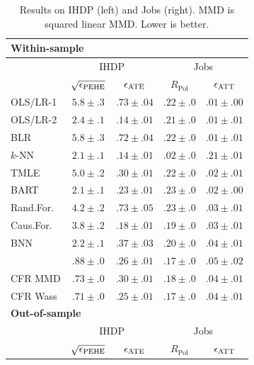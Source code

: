 \begin{table}[t!]
  \caption{\label{tbl:ihdp_jobs_results}Results on IHDP (left) and Jobs (right). MMD is squared linear MMD. Lower is better. \vspace{-1.3em}}
  \begin{center}
    \begin{small}
      \begin{sc}
      \begin{tabular}{l|cc|cc}
        \multicolumn{5}{l}{\bf{Within-sample}} \\
        \hline
        & \multicolumn{2}{c|}{IHDP} & \multicolumn{2}{c}{Jobs} \\
        & $\sqrt{\epsilon_{\text{PEHE}}}$ & $\epsilon_{\text{ATE}}$ & $R_{\text{Pol}}$  & $\epsilon_{\text{ATT}}$\\
        \hline
        OLS/LR-1 & $5.8 \pm .3$ & $.73 \pm .04$ & $.22 \pm .0$ & $.01 \pm .00$ \\
        OLS/LR-2  & $2.4 \pm .1$ & $.14 \pm .01$ & $.21 \pm .0$ & $.01 \pm .01$ \\
        BLR  & $5.8 \pm .3$ & $.72 \pm .04$ & $.22 \pm .0$ & $.01 \pm .01$ \\
        $k$-NN & $2.1 \pm .1$ & $.14 \pm .01$ & $.02 \pm .0$ & $.21 \pm .01$ \\
		    TMLE  & $5.0 \pm .2$ & $.30 \pm .01$ & $.22 \pm .0$ & $.02 \pm .01$ \\
        BART  & $2.1 \pm .1$ & $.23 \pm .01$ & $.23 \pm .0$ & $.02 \pm .00$ \\
        Rand.For.  & $4.2 \pm .2$ & $.73 \pm .05$ & $.23 \pm .0$ & $.03 \pm .01$ \\
        Caus.For.  & $3.8 \pm .2$ & $.18 \pm .01$ & $.19 \pm .0$ & $.03 \pm .01$ \\
        BNN  & $2.2 \pm .1$ & $.37 \pm .03$ & $.20 \pm .0$ & $.04 \pm .01$ \\
        \tarnet{}  & $.88 \pm .0$ & $.26 \pm .01$ & $.17 \pm .0$ & $.05 \pm .02$ \\
        CFR MMD & $.73 \pm .0$ & $.30 \pm .01$ & $.18 \pm .0$ & $.04 \pm .01$ \\
        CFR Wass & $.71 \pm .0$ & $.25 \pm .01$ & $.17 \pm .0$ & $.04 \pm .01$ \\
        \hline
        \multicolumn{5}{l}{\bf{Out-of-sample}} \\
        \hline
        & \multicolumn{2}{c|}{IHDP} & \multicolumn{2}{c}{Jobs} \\
        & $\sqrt{\epsilon_{\text{PEHE}}}$ & $\epsilon_{\text{ATE}}$ & $R_{\text{Pol}}$  & $\epsilon_{\text{ATT}}$\\

\end{tabular}
\end{sc}
\end{small}
\end{center}
\end{table}
